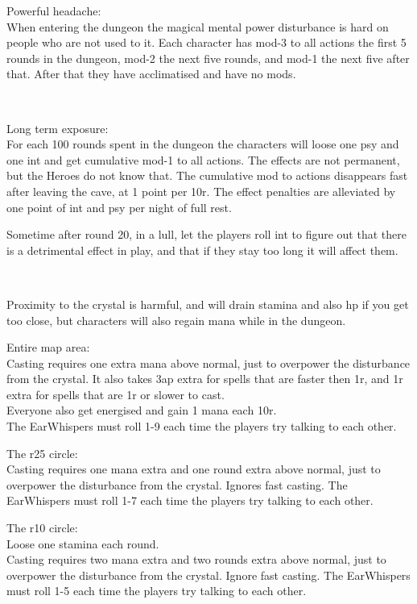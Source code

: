 Powerful headache:\\
When entering the dungeon the magical mental power disturbance is hard on people who are not used to it. Each character has mod-3 to all actions the first 5 rounds in the dungeon, mod-2 the next five rounds, and mod-1 the next five after that. After that they have acclimatised and have no mods.

\

Long term exposure:\\
For each 100 rounds spent in the dungeon the characters will loose one psy and one int and get cumulative mod-1 to all actions. The effects are not permanent, but the Heroes do not know that. The cumulative mod to actions disappears fast after leaving the cave, at 1 point per 10r. The effect penalties are alleviated by one point of int and psy per night of full rest.

Sometime after round 20, in a lull, let the players roll int to figure out that there is a detrimental effect in play, and that if they stay too long it will affect them.

\

Proximity to the crystal is harmful, and will drain stamina and also hp if you get too close, but characters will also regain mana while in the dungeon.

Entire map area:\\
Casting requires one extra mana above normal, just to overpower the disturbance from the crystal. It also takes 3ap extra for spells that are faster then 1r, and 1r extra for spells that are 1r or slower to cast.\\
Everyone also get energised and gain 1 mana each 10r.\\
The EarWhispers must roll 1-9 each time the players try talking to each other.

The r25 circle:\\
Casting requires one mana extra and one round extra above normal, just to overpower the disturbance from the crystal. Ignores fast casting.
The EarWhispers must roll 1-7 each time the players try talking to each other.

The r10 circle:\\
Loose one stamina each round.\\
Casting requires two mana extra and two rounds extra above normal, just to
overpower the disturbance from the crystal. Ignore fast casting.
The EarWhispers must roll 1-5 each time the players try talking to each other.

